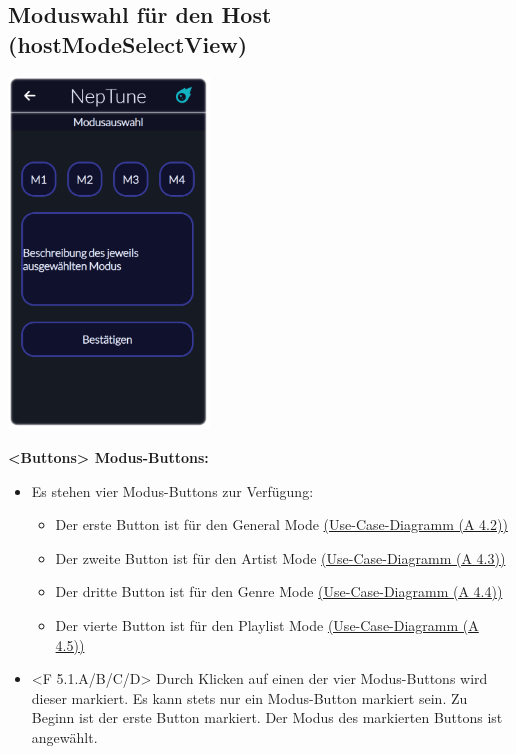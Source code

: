\documentclass[oneside, ngerman]{sdqtechreport}
\begin{document}
\subsection{Moduswahl für den Host (hostModeSelectView)}
\label{sec:Benutzeroberfläche:hostModeSelectView}


\begin{center}
    \hypertarget{hostModeSelectView}{}
    \includegraphics[width=0.4\textwidth]{LATEX/Pflichtenheft/GraphicDesigns/hostModusSelectPage.png}
\end{center}

\textbf{<Buttons> Modus-Buttons:}
\begin{itemize}
    \item Es stehen vier Modus-Buttons zur Verfügung:
    \begin{itemize}
        \item Der erste Button ist für den General Mode \hyperlink{General Mode}{(Use-Case-Diagramm (A 4.2))}
        \item Der zweite Button ist für den Artist Mode \hyperlink{Artist Mode}{(Use-Case-Diagramm (A 4.3))}
        \item Der dritte Button ist für den Genre Mode \hyperlink{Genre Mode}{(Use-Case-Diagramm (A 4.4))}
        \item Der vierte Button ist für den Playlist Mode \hyperlink{Playlist Mode}{(Use-Case-Diagramm (A 4.5))}
    \end{itemize}
    \item \hypertarget{<F 5.1.M>}{} <F 5.1.A/B/C/D> Durch Klicken auf einen der vier Modus-Buttons wird dieser markiert. Es kann stets nur ein Modus-Button markiert sein. Zu Beginn ist der erste Button markiert. Der Modus des markierten Buttons ist angewählt.
\end{itemize}
\end{document}
